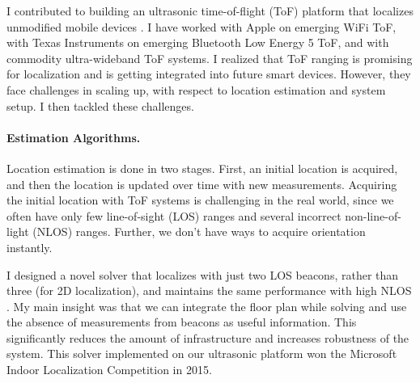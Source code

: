 \documentclass[10pt]{article}
\begin{document}
I contributed to building an ultrasonic time-of-flight (ToF) platform that localizes unmodified mobile devices \cite{rtas-alps-platform, lazik2015alps,lazik2015alpsdemo}.  I have worked with Apple on emerging WiFi ToF, with Texas Instruments on emerging Bluetooth Low Energy 5 ToF, and with commodity ultra-wideband ToF systems. I realized that ToF ranging is promising for localization and is getting integrated into future smart devices.  However, they face challenges in scaling up, with respect to location estimation and system setup. I then tackled these challenges. 


\paragraph{Estimation Algorithms. } 
Location estimation is done in two stages. First, an initial location is acquired, and then the location is updated over time with new measurements. 
Acquiring the initial location with ToF systems is challenging in the real world, since we often have only few line-of-sight (LOS) ranges and several incorrect non-line-of-light (NLOS) ranges. Further, we don't have ways to acquire orientation instantly. 

I designed a novel solver that localizes with just two LOS beacons, rather than three (for 2D localization), and maintains the same performance with high NLOS \cite{rajagopal2018enhancing}.  %
My main insight was that we can integrate the floor plan while solving and use the absence of measurements from beacons as useful information. 
This significantly reduces the amount of infrastructure and increases robustness of the system. 
This solver implemented on our ultrasonic platform won the Microsoft Indoor Localization Competition in 2015. %
\end{document}
